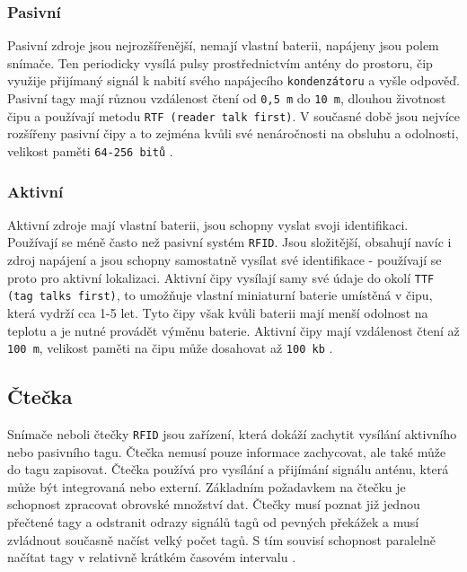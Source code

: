 \documentclass[czech,BP]{thesiskiv}
\begin{document}
\subsubsection{Pasivní}
Pasivní zdroje jsou nejrozšířenější, nemají vlastní baterii, napájeny jsou polem snímače. Ten periodicky vysílá pulsy prostřednictvím antény do prostoru, čip využije přijímaný signál k nabití svého napájecího \texttt{kondenzátoru} a vyšle odpověď. Pasivní tagy mají různou vzdálenost čtení od \texttt{0,5 m} do \texttt{10 m}, dlouhou životnost čipu a používají metodu \texttt{RTF (reader talk first)}. V současné době jsou nejvíce rozšířeny pasivní čipy a to zejména kvůli své nenáročnosti na obsluhu a odolnosti, velikost paměti \texttt{64-256 bitů} \cite{dolevcek2010identifikace}.


\subsubsection{Aktivní}
Aktivní zdroje mají vlastní baterii, jsou schopny vyslat svoji identifikaci. Používají se méně často než pasivní systém \texttt{RFID}. Jsou složitější, obsahují navíc i zdroj napájení a jsou schopny samostatně vysílat své identifikace - používají se proto pro aktivní lokalizaci.
Aktivní čipy vysílají samy své údaje do okolí \texttt{TTF (tag talks first)}, to umožňuje vlastní miniaturní baterie umístěná v čipu, která vydrží cca 1-5 let. Tyto čipy však kvůli baterii mají menší odolnost na teplotu a je nutné provádět výměnu baterie. Aktivní čipy mají vzdálenost čtení až \texttt{100 m}, velikost paměti na čipu může dosahovat až \texttt{100 kb} \cite{dolevcek2010identifikace}.


\subsection{Čtečka}
Snímače neboli čtečky \texttt{RFID} jsou zařízení, která dokáží zachytit vysílání aktivního nebo pasivního tagu. Čtečka nemusí pouze informace zachycovat, ale také může do tagu zapisovat. Čtečka používá pro vysílání a přijímání signálu anténu, která může být integrovaná nebo externí. Základním požadavkem na čtečku je schopnost zpracovat obrovské množství dat. Čtečky musí poznat již jednou přečtené tagy a odstranit odrazy signálů tagů od pevných překážek a musí zvládnout současně načíst velký počet tagů. S tím souvisí schopnost paralelně načítat tagy v relativně krátkém časovém intervalu \cite{dolevcek2010identifikace}.	
	
	
	
\end{document}
